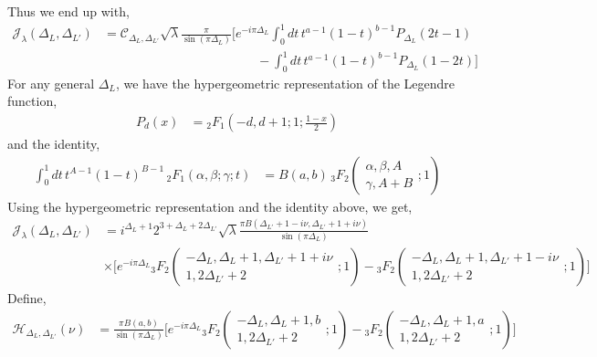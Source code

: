 \documentclass[11pt]{article}
\newcommand{\nn}{\nonumber}
\newcommand{\lb}{\left(}
\newcommand{\rb}{\right)}
\begin{document}
Thus we end up with,
\begin{align}\label{eq: Legendre representation of J_lambda}
    \mathcal{J}_\lambda(\Delta_L,\Delta_{L'}) &= \mathcal{C}_{\Delta_L,\Delta_{L'}} \sqrt \lambda \frac{\pi}{\sin (\pi \Delta_L)} \Big[ e^{-i\pi \Delta_L}\int_0^1 dt\, t^{a-1}(1-t)^{b-1} P_{\Delta_L}(2t-1) \nn \\
    &\qquad\qquad\qquad\qquad\qquad\qquad- \int_0^1 dt \, t^{a-1}(1-t)^{b-1}P_{\Delta_L}(1-2t)\Big]
\end{align}
For any general $\Delta_L$, we have the hypergeometric representation of the Legendre function,
\begin{align}
    P_d(x) &={} _2F_1\lb -d,d+1;1;\frac{1-x}{2}\rb
\end{align}
and the identity,
\begin{align}
    \int_0^1 dt\, t^{A-1}(1-t)^{B-1} \,_2F_1\lb \alpha ,\beta;\gamma;t\rb &= B(a,b) \,{}_3F_2\!\left(
\begin{matrix}
\alpha,\beta,A\\
\gamma,A+B
\end{matrix}
;1
\right)
\end{align}
Using the hypergeometric representation and the identity above, we get,
\begin{align}
    \mathcal{J}_\lambda(\Delta_L,\Delta_{L'}) &= i^{\Delta_L+1}2^{3+\Delta_L+2\Delta_{L'}}\sqrt \lambda \frac{\pi B(\Delta_{L'}+1-i\nu,\Delta_{L'}+1+i\nu)}{\sin(\pi \Delta_L)} \nn\\
    &\times \Bigg[ e^{-i\pi \Delta_L} {}_3F_2\lb \begin{matrix}
        -\Delta_L , \Delta_L+1,\Delta_{L'}+1+i\nu \\1,2\Delta_{L'}+2
    \end{matrix};1\rb - {}_3F_2\lb \begin{matrix}
        -\Delta_L , \Delta_L+1,\Delta_{L'}+1-i\nu \\1,2\Delta_{L'}+2
    \end{matrix};1\rb\Bigg]
\end{align}
Define,
\begin{align}\label{eq: H_DeltaLDeltaL' (nu)}
    \mathcal{H}_{\Delta_L,\Delta_{L'}}(\nu) &=  \frac{\pi B(a,b)}{\sin(\pi\Delta_L)}\Bigg[ e^{-i\pi \Delta_L} {}_3F_2\lb \begin{matrix}
        -\Delta_L , \Delta_L+1,b \\1,2\Delta_{L'}+2
    \end{matrix};1\rb - {}_3F_2\lb \begin{matrix}
        -\Delta_L , \Delta_L+1,a \\1,2\Delta_{L'}+2
    \end{matrix};1\rb\Bigg]
\end{align}
\end{document}
